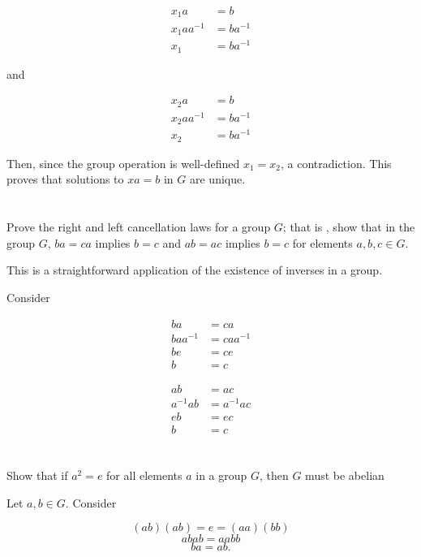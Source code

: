 \documentclass[a4paper]{article}
\begin{document}
\begin{align*}
x_1 a &= b \\
x_1 a a^{-1} &= b a^{-1} \\
x_1 &= b a^{-1}
\end{align*}

and 

\begin{align*}
x_2 a &= b \\
x_2 a a^{-1} &= b a^{-1} \\
x_2 &= b a^{-1}
\end{align*}

Then, since the group operation is well-defined $x_1 = x_2$, a contradiction. This proves that solutions to $xa = b$ in $G$ are unique.


\section{}


\section{}

Prove the right and left cancellation laws for a group $G$; that is , show that in the group $G$, $ba = ca$ implies $b = c$ and $ab = ac$ implies $b = c$ for elements $a,b,c \in G$.

\vspace{\baselineskip}

This is a straightforward application of the existence of inverses in a  group.

Consider

\begin{align*}
ba &= ca \\
baa^{-1} &= caa^{-1} \\
be &= ce \\ 
b &= c
\end{align*}

\begin{align*}
ab &= ac \\
a^{-1}ab &= a^{-1}ac \\
eb &= ec \\
b &= c
\end{align*}


\section{}

Show that if $a^2 = e$ for all elements $a$ in a group $G$, then $G$ must be abelian

\vspace{\baselineskip}

Let $a,b \in G$. Consider

$$(ab)(ab) = e = (aa)(bb)$$
$$abab = aabb$$
$$ ba = ab.$$
\end{document}
